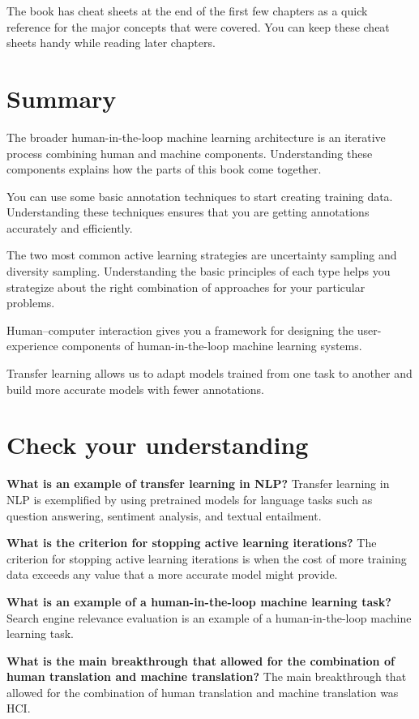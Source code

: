 \documentclass[sigconf,nonacm,screen,pbalance]{acmart}
\begin{document}
The
book has cheat sheets at the end of the first few chapters as a quick reference for the
major concepts that were covered. You can keep these cheat sheets handy while reading
later chapters.

\section{Summary}

The
broader human-in-the-loop machine learning architecture is an iterative process
combining human and machine components. Understanding these components explains how the
parts of this book come together.

You
can use some basic annotation techniques to start creating training data. Understanding
these techniques ensures that you are getting annotations accurately and efficiently.

The
two most common active learning strategies are uncertainty sampling and diversity
sampling. Understanding the basic principles of each type helps you strategize about the
right combination of approaches for your particular problems.

Human–computer
interaction gives you a framework for designing the user-experience components of
human-in-the-loop machine learning systems.

Transfer
learning allows us to adapt models trained from one task to another and build more
accurate models with fewer annotations.

\section{Check your understanding}

{\bf What is an example of transfer learning in NLP?}
Transfer
learning in NLP is exemplified by using
pretrained models for language tasks such as question answering,
sentiment analysis, and textual entailment.

{\bf What is the criterion for stopping active learning iterations?}
The
criterion for stopping active learning iterations is when the cost of
more training data exceeds any value that a more accurate model might
provide.

{\bf What is an example of a human-in-the-loop machine learning task?}
Search
engine relevance evaluation is an example of a human-in-the-loop machine
learning task.

{\bf What is the main breakthrough that allowed for the combination of human translation and machine translation?}
The
main breakthrough that allowed for the combination of human translation
and machine translation was HCI.
\end{document}
